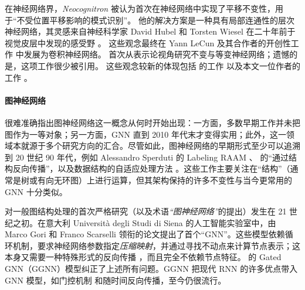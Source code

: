 在神经网络界，\emph{Neocognitron} \citep{fukushima1982neocognitron} 被认为首次在神经网络中实现了平移不变性，用于“不受位置平移影响的模式识别”。
%
他的解决方案是一种具有局部连通性的层次神经网络，其灵感来自神经科学家 David Hubel 和 Torsten Wiesel 在二十年前于视觉皮层中发现的感受野 \citep{hubel1959receptive}。
%
这些观念最终在 Yann LeCun 及其合作者的开创性工作 \citep{lecun1998gradient} 中发展为卷积神经网络。
%
\citet{wood1996representation} 首次从表示论视角研究不变与等变神经网络；遗憾的是，这项工作很少被引用。
%
这些观念较新的体现包括 \citet{makadia2007correspondence,esteves2020spin} 的工作
以及本文一位作者的工作 \citep{cohen2016group}。













\paragraph{图神经网络}
很难准确指出图神经网络这一概念从何时开始出现：一方面，多数早期工作并未把图作为一等对象；另一方面，GNN 直到 2010 年代末才变得实用；此外，这一领域本就源于多个研究方向的汇合。尽管如此，图神经网络的早期形式至少可以追溯到 20 世纪 90 年代，例如 Alessandro Sperduti 的 Labeling RAAM \citep{sperduti1994encoding}、%
\cite{goller1996learning} 的“通过结构反向传播”，以及数据结构的自适应处理方法%
\citep{sperduti1997supervised,frasconi1998general}。这些工作主要关注在“结构”（通常是树或有向无环图）上进行运算，但其架构保持的许多不变性与当今更常用的 GNN 十分类似。



对一般图结构处理的首次严格研究（以及术语\emph{“图神经网络”}的提出）发生在 21 世纪之初。在意大利 Universit\`{a} degli Studi di Siena 的人工智能实验室中，由 Marco Gori 和 Franco Scarselli 领衔的论文提出了首个“GNN”\citep{gori2005new,scarselli2008graph}。这些模型依赖循环机制，要求神经网络参数指定\emph{压缩映射}，并通过寻找不动点来计算节点表示；这本身又需要一种特殊形式的反向传播 \citep{almeida1990learning,pineda1988generalization}，而且完全不依赖节点特征。\cite{li2015gated} 的 Gated GNN（GGNN）模型纠正了上述所有问题。GGNN 把现代 RNN 的许多优点带入 GNN 模型，如门控机制 \citep{cho2014learning} 和随时间反向传播，至今仍很流行。


